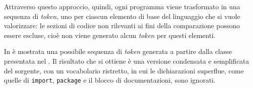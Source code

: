 Attraverso questo approccio, quindi, ogni programma viene trasformato in una sequenza di \textit{token}, uno per ciascun elemento di base del linguaggio che si vuole valorizzare: le sezioni di codice non rilevanti ai fini della comparazione possono essere escluse, cioè non viene generato alcun \textit{token} per questi elementi.

In  è mostrata una possibile sequenza di \textit{token} generata a partire dalla classe presentata nel .
%
Il risultato che si ottiene è una versione condensata e semplificata del sorgente, con un vocabolario ristretto, in cui le dichiarazioni superflue, come quelle di \texttt{import}, \texttt{package} e il blocco di documentazioni, sono ignorati.



